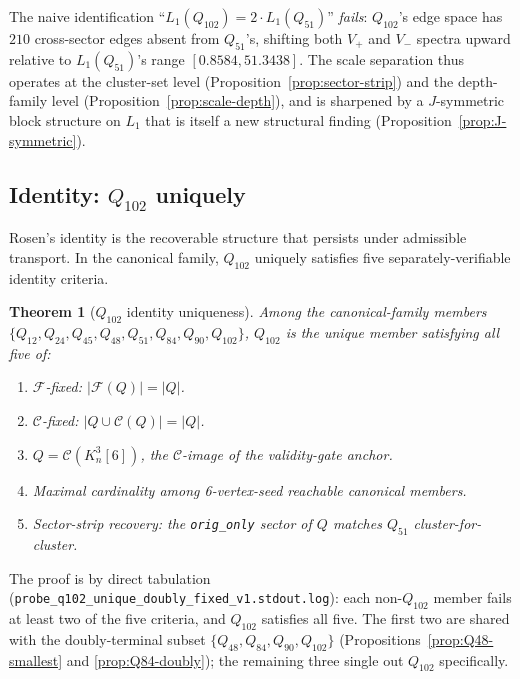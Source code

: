 \documentclass[12pt,a4paper]{article}
\newtheorem{theorem}{Theorem}[section]
\theoremstyle{definition}
\theoremstyle{remark}
\newcommand{\Kn}{K_n^3}
\newcommand{\Ccls}{\mathcal{C}}             %
\newcommand{\Fcls}{\mathcal{F}}             %
\begin{document}
The naive identification ``$L_1(Q_{102}) = 2 \cdot L_1(Q_{51})$''
\emph{fails}: $Q_{102}$'s edge space has $210$ cross-sector edges
absent from $Q_{51}$'s, shifting both $V_+$ and $V_-$ spectra upward
relative to $L_1(Q_{51})$'s range $[0.8584, 51.3438]$. The scale
separation thus operates at the cluster-set level
(Proposition~\ref{prop:sector-strip}) and the depth-family level
(Proposition~\ref{prop:scale-depth}), and is sharpened by a
$J$-symmetric block structure on $L_1$ that is itself a new
structural finding (Proposition~\ref{prop:J-symmetric}).

\subsection{Identity: $Q_{102}$ uniquely}\label{sec:fr-identity}

Rosen's identity is the recoverable structure that persists under
admissible transport. In the canonical family, $Q_{102}$ uniquely
satisfies five separately-verifiable identity criteria.

\begin{theorem}[$Q_{102}$ identity uniqueness]\label{thm:Q102-identity-unique}
Among the canonical-family members $\{Q_{12}, Q_{24}, Q_{45},
Q_{48}, Q_{51}, Q_{84}, Q_{90}, Q_{102}\}$, $Q_{102}$ is the unique
member satisfying all five of:
\begin{enumerate}\setlength\itemsep{0pt}
\item[\textnormal{(1)}] $\Fcls$-fixed: $|\Fcls(Q)| = |Q|$.
\item[\textnormal{(2)}] $\Ccls$-fixed: $|Q \cup \Ccls(Q)| = |Q|$.
\item[\textnormal{(3)}] $Q = \Ccls(\Kn[6])$, the $\Ccls$-image of the
validity-gate anchor.
\item[\textnormal{(4)}] Maximal cardinality among 6-vertex-seed
reachable canonical members.
\item[\textnormal{(5)}] Sector-strip recovery: the
\texttt{orig\_only} sector of $Q$ matches $Q_{51}$ cluster-for-cluster.
\end{enumerate}
\end{theorem}

The proof is by direct tabulation
(\texttt{probe\_q102\_unique\_doubly\_fixed\_v1.stdout.log}):
each non-$Q_{102}$ member fails at least two of the five criteria,
and $Q_{102}$ satisfies all five. The first two are shared with the
doubly-terminal subset $\{Q_{48}, Q_{84}, Q_{90}, Q_{102}\}$
(Propositions~\ref{prop:Q48-smallest} and \ref{prop:Q84-doubly}); the
remaining three single out $Q_{102}$ specifically.
\end{document}
